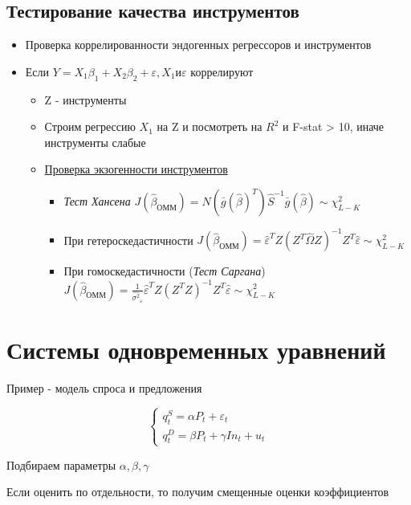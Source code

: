 \documentclass[a4paper, 12pt]{article}
\begin{document}
\subsection{Тестирование качества инструментов}
\begin{itemize}
    \item Проверка коррелированности эндогенных регрессоров и инструментов
    \item Если $Y = X_{1}\beta_{1} + X_{2}\beta_{2} + \varepsilon, X_{1} \textrm{и} \varepsilon$ коррелируют
    \begin{itemize}
        \item Z - инструменты
        \item Строим регрессию $X_{1}$ на Z и посмотреть на $R^{2}$ и F-stat > 10, иначе инструменты слабые
        \item \underline{Проверка экзогенности инструментов}
        \begin{itemize}
            \item \textit{Тест Хансена}
            $J(\hat{\beta}_{ОММ}) = N(\bar{g}(\hat{\beta})^{T})\hat{S}^{-1}\bar{g}(\hat{\beta}) \sim \chi^{2}_{L - K}$
            \item При гетероскедастичности
            $J(\hat{\beta}_{ОММ}) = \hat{\varepsilon}^{T}Z(Z^{T}\hat{\Omega}Z)^{-1}Z^{T}\hat{\varepsilon} \sim \chi^{2}_{L - K}$
            \item При гомоскедастичности (\textit{Тест Саргана})
            $J(\hat{\beta}_{ОММ}) = \frac{1}{\hat{\sigma^{2}}_{\varepsilon}}\hat{\varepsilon}^{T}Z(Z^{T}Z)^{-1}Z^{T}\hat{\varepsilon} \sim \chi^{2}_{L - K}$
        \end{itemize}
    \end{itemize}
\end{itemize}

\section{Системы одновременных уравнений}

Пример - модель спроса и предложения

\[\begin{cases}
    q_{t}^{S} = \alpha P_{t} + \varepsilon_{t} \\
    q_{t}^{D} = \beta P_{t} + \gamma In_{t} + u_{t}
\end{cases}\]

Подбираем параметры $\alpha, \beta, \gamma$

Если оценить по отдельности, то получим смещенные оценки коэффициентов
\end{document}
